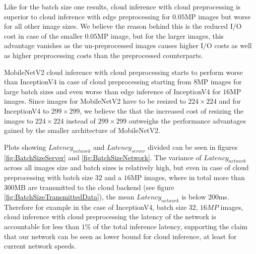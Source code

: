 Like for the batch size one results, cloud inference with cloud preprocessing is superior to cloud inference with edge preprocessing for $0.05$MP images but worse for all other image sizes.
We believe the reason behind this is the reduced I/O cost in case of the smaller $0.05$MP image, but for the larger images, this advantage vanishes as the un-preprocessed images causes higher I/O costs as well as higher preprocessing costs than the preprocessed counterparts.

MobileNetV2 cloud inference with cloud preprocessing starts to perform worse than InceptionV4 in case of cloud preprocessing starting from $8$MP images for large batch sizes and even worse than edge inference of InceptionV4 for $16$MP images.
Since images for MobileNetV2 have to be resized to $224\times224$ and for InceptionV4 to $299\times299$, we believe the that the increased cost of resizing the images to $224\times224$ instead of $299\times299$ outweighs the performance advantages gained by the smaller architecture of MobileNetV2.

Plots showing $Latency_{network}$ and $Latency_{server}$ divided can be seen in figures \ref{fig:BatchSizeServer} and \ref{fig:BatchSizeNetwork}.
The variance of $Latency_{network}$ across all images size and batch sizes is relatively high, but even in case of cloud preprocessing with batch size $32$ and a $16$MP images, where in total more than $300$MB are transmitted to the cloud backend (see figure \ref{fig:BatchSizeTransmittedData}), the mean $Latency_{network}$ is below $200$ms. 
Therefore for example in the case of InceptionV4, batch size $32$, $16MP$ images, cloud inference with cloud preprocessing the latency of the network is accountable for less than $1\%$ of the total inference latency, supporting the claim that our network can be seen as lower bound for cloud inference, at least for current network speeds.

